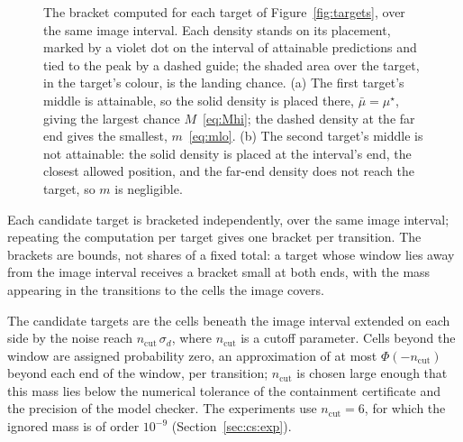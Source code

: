 \documentclass[11pt,a4paper]{article}
\theoremstyle{plain}
\theoremstyle{remark}
\begin{document}
\begin{figure}[h]
		\caption{The bracket computed for each target of
			Figure~\ref{fig:targets}, over the same image interval. Each density
			stands on its placement, marked by a violet dot on the interval of
			attainable predictions and tied to the peak by a dashed guide; the
			shaded area over the target, in the target's colour, is the landing
			chance. (a) The first target's middle is attainable, so the solid
			density is placed there, $\bar\mu = \mu^\star$, giving the largest
			chance $M$~\eqref{eq:Mhi}; the dashed density at the far end gives
			the smallest, $m$~\eqref{eq:mlo}. (b) The second target's middle is
			not attainable: the solid density is placed at the interval's end,
			the closest allowed position, and the far-end density does not reach
			the target, so $m$ is negligible.}
		\label{fig:gaussmass}
	\end{figure}
	
	Each candidate target is bracketed independently, over the same image
	interval; repeating the computation per target gives one bracket per
	transition. The brackets are bounds, not shares of a fixed total: a
	target whose window lies away from the image interval receives a
	bracket small at both ends, with the mass appearing in the
	transitions to the cells the image covers. 
	
	The candidate targets are the cells beneath the image interval
	extended on each side by the noise reach
	$n_{\mathrm{cut}}\,\sigma_d$, where $n_{\mathrm{cut}}$ is a cutoff
	parameter. Cells beyond the window are assigned probability zero, an
	approximation of at most $\Phi(-n_{\mathrm{cut}})$ beyond each end of
	the window, per transition; $n_{\mathrm{cut}}$ is chosen large enough
	that this mass lies below the numerical tolerance of the containment
	certificate and the precision of the model checker. The experiments
	use $n_{\mathrm{cut}} = 6$, for which the ignored mass is of order
	$10^{-9}$ (Section~\ref{sec:cs:exp}).
	
\end{document}
